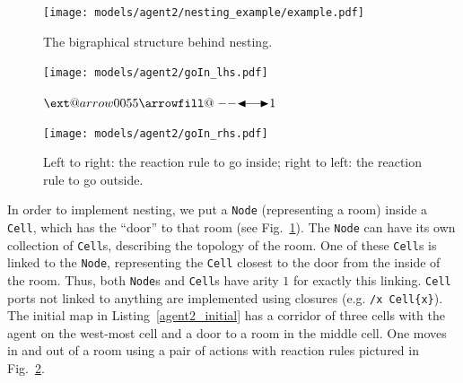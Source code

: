 \documentclass[runningheads]{llncs}
\makeatletter
\providecommand\longdoublearrowRHD{\mathrel\LHD\joinrel\relbar\joinrel\relbar\joinrel\mathrel\RHD}
\providecommand*\xdoublearrowRHD[2][]{\ext@arrow 0055{\arrowfill@\relbar\relbar\longdoublearrowRHD}{#1}{#2}}
\makeatother
\begin{document}
\begin{figure}
  \centering
  \texttt{[image: models/agent2/nesting\_example/example.pdf]}
  \caption{The bigraphical structure behind nesting.}
  \label{agent2_nesting}
\end{figure}



\begin{figure}
  \centering
  \begin{minipage}{0.45\textwidth}
    \centering
    \texttt{[image: models/agent2/goIn\_lhs.pdf]}
  \end{minipage}
  $\xdoublearrowRHD{1}$
  \begin{minipage}{0.45\textwidth}
    \centering
    \texttt{[image: models/agent2/goIn\_rhs.pdf]}
  \end{minipage}
  \caption{Left to right: the reaction rule to go inside; right to left: the
    reaction rule to go outside.}
  \label{go_in_out}
\end{figure}

In order to implement nesting, we put a \texttt{Node} (representing a room)
inside a \texttt{Cell}, which has the ``door'' to that room (see
Fig.~\ref{agent2_nesting}). The \texttt{Node} can have its own collection of
\texttt{Cell}s, describing the topology of the room. One of these \texttt{Cell}s
is linked to the \texttt{Node}, representing the \texttt{Cell} closest to the
door from the inside of the room. Thus, both \texttt{Node}s and \texttt{Cell}s
have arity $1$ for exactly this linking. \texttt{Cell} ports not linked to
anything are implemented using closures (e.g. \texttt{/x Cell\{x\}}). The
initial map in Listing~\ref{agent2_initial} has a corridor of three cells with
the agent on the west-most cell and a door to a room in the middle cell. One
moves in and out of a room using a pair of actions with reaction rules pictured
in Fig.~\ref{go_in_out}.
\end{document}
